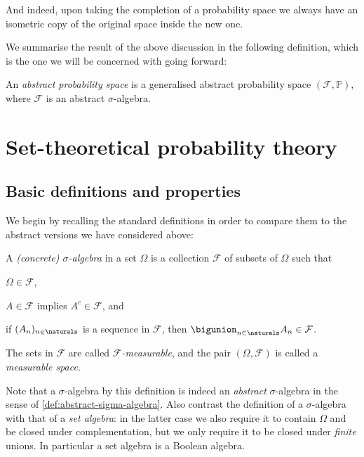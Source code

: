 \documentclass[article, a4paper, 11pt, oneside]{memoir}
\numberwithin{equation}{chapter}
\newcommand{\calF}{\mathcal{F}}
\renewcommand{\P}{\mathbb{P}}
\begin{document}
%
And indeed, upon taking the completion of a probability space we always have an isometric copy of the original space inside the new one.

We summarise the result of the above discussion in the following definition, which is the one we will be concerned with going forward:

\begin{definition}
    \label{def:abstract-probability-space}
    An \emph{abstract probability space} is a generalised abstract probability space $(\calF, \P)$, where $\calF$ is an abstract $\sigma$-algebra.
\end{definition}


\chapter{Set-theoretical probability theory}

\section{Basic definitions and properties}

We begin by recalling the standard definitions in order to compare them to the abstract versions we have considered above:

\begin{definition}
    A \emph{(concrete) $\sigma$-algebra} in a set $\Omega$ is a collection $\calF$ of subsets of $\Omega$ such that
    \begin{enumdef}
        \item $\Omega \in \calF$,
        \item $A \in \calF$ implies $A^c \in \calF$, and
        \item if $(A_n)_{n\in\naturals}$ is a sequence in $\calF$, then $\bigunion_{n\in\naturals} A_n \in \calF$.
    \end{enumdef}
    The sets in $\calF$ are called \emph{$\calF$-measurable}, and the pair $(\Omega, \calF)$ is called a \emph{measurable space}.
\end{definition}
%
Note that a $\sigma$-algebra by this definition is indeed an \emph{abstract} $\sigma$-algebra in the sense of \cref{def:abstract-sigma-algebra}. Also contrast the definition of a $\sigma$-algebra with that of a \emph{set algebra}: in the latter case we also require it to contain $\Omega$ and be closed under complementation, but we only require it to be closed under \emph{finite} unions. In particular a set algebra is a Boolean algebra.
\end{document}
